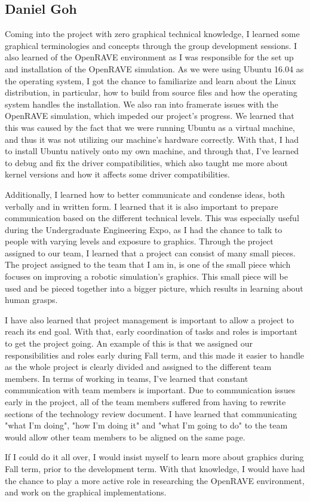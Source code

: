 \documentclass[10pt,journal,compsoc,draftclsnofoot]{IEEEtran}
\begin{document}
\begin{flushleft}
\subsection{Daniel Goh}
Coming into the project with zero graphical technical knowledge, I learned some graphical terminologies and concepts through the group development sessions.
I also learned of the OpenRAVE environment as I was responsible for the set up and installation of the OpenRAVE simulation.
As we were using Ubuntu 16.04 as the operating system, I got the chance to familiarize and learn about the Linux distribution, in particular, how to build from source files and how the operating system handles the installation.
We also ran into framerate issues with the OpenRAVE simulation, which impeded our project's progress.
We learned that this was caused by the fact that we were running Ubuntu as a virtual machine, and thus it was not utilizing our machine's hardware correctly.
With that, I had to install Ubuntu natively onto my own machine, and through that, I've learned to debug and fix the driver compatibilities, which also taught me more about kernel versions and how it affects some driver compatibilities.  
\par
\vspace{3mm}
Additionally, I learned how to better communicate and condense ideas, both verbally and in written form.
I learned that it is also important to prepare communication based on the different technical levels.
This was especially useful during the Undergraduate Engineering Expo, as I had the chance to talk to people with varying levels and exposure to graphics.
Through the project assigned to our team, I learned that a project can consist of many small pieces.
The project assigned to the team that I am in, is one of the small piece which focuses on improving a robotic simulation's graphics.
This small piece will be used and be pieced together into a bigger picture, which results in learning about human grasps.
\par
\vspace{3mm}
I have also learned that project management is important to allow a project to reach its end goal.
With that, early coordination of tasks and roles is important to get the project going.
An example of this is that we assigned our responsibilities and roles early during Fall term, and this made it easier to handle as the whole project is clearly divided and assigned to the different team members.
In terms of working in teams, I've learned that constant communication with team members is important.
Due to communication issues early in the project, all of the team members suffered from having to rewrite sections of the technology review document.
I have learned that communicating "what I'm doing", "how I'm doing it" and "what I'm going to do" to the team would allow other team members to be aligned on the same page.
\par
\vspace{3mm}
If I could do it all over, I would insist myself to learn more about graphics during Fall term, prior to the development term.
With that knowledge, I would have had the chance to play a more active role in researching the OpenRAVE environment, and work on the graphical implementations.


\end{flushleft}
\end{document}
